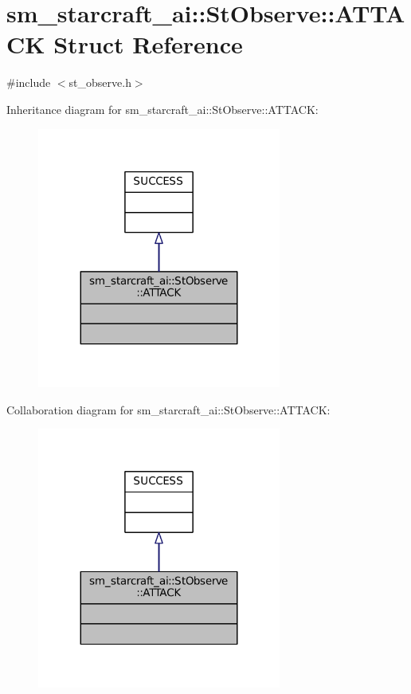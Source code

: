 \hypertarget{structsm__starcraft__ai_1_1StObserve_1_1ATTACK}{}\section{sm\+\_\+starcraft\+\_\+ai\+:\+:St\+Observe\+:\+:A\+T\+T\+A\+CK Struct Reference}
\label{structsm__starcraft__ai_1_1StObserve_1_1ATTACK}


{\ttfamily \#include $<$st\+\_\+observe.\+h$>$}



Inheritance diagram for sm\+\_\+starcraft\+\_\+ai\+:\+:St\+Observe\+:\+:A\+T\+T\+A\+CK\+:
\nopagebreak
\begin{figure}[H]
\begin{center}
\leavevmode
\includegraphics[width=227pt]{structsm__starcraft__ai_1_1StObserve_1_1ATTACK__inherit__graph}
\end{center}
\end{figure}


Collaboration diagram for sm\+\_\+starcraft\+\_\+ai\+:\+:St\+Observe\+:\+:A\+T\+T\+A\+CK\+:
\nopagebreak
\begin{figure}[H]
\begin{center}
\leavevmode
\includegraphics[width=227pt]{structsm__starcraft__ai_1_1StObserve_1_1ATTACK__coll__graph}
\end{center}
\end{figure}


